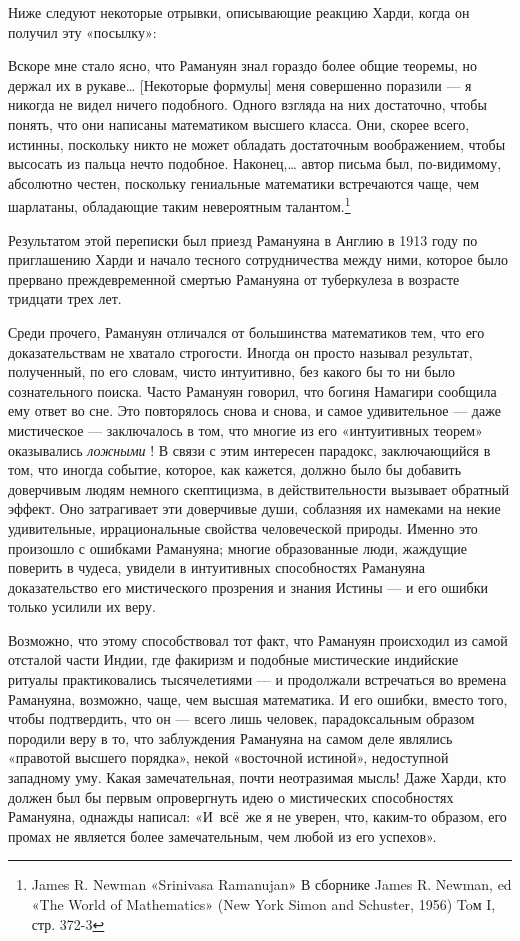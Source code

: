 \documentclass[../main.tex]{subfiles}
\begin{document}
Ниже следуют некоторые отрывки, описывающие реакцию Харди, когда он получил эту «посылку»:

Вскоре мне стало ясно, что Рамануян знал гораздо более общие теоремы, но держал их в рукаве\ldots{} {[}Некоторые формулы{]} меня совершенно поразили --- я никогда не видел ничего подобного. Одного взгляда на них достаточно, чтобы понять, что они написаны математиком высшего класса. Они, скорее всего, истинны, поскольку никто не может обладать достаточным воображением, чтобы высосать из пальца нечто подобное. Наконец,\ldots{} автор письма был, по-видимому, абсолютно честен, поскольку гениальные математики встречаются чаще, чем шарлатаны, обладающие таким невероятным талантом.\footnote{James R. Newman «Srinivasa Ramanujan» В сборнике James R. Newman, ed «The World of Mathematics» (New York Simon and Schuster, 1956) Toм I, стр. 372-3}

Результатом этой переписки был приезд Рамануяна в Англию в 1913 году по приглашению Харди и начало тесного сотрудничества между ними, которое было прервано преждевременной смертью Рамануяна от туберкулеза в возрасте тридцати трех лет.

Среди прочего, Рамануян отличался от большинства математиков тем, что его доказательствам не хватало строгости. Иногда он просто называл результат, полученный, по его словам, чисто интуитивно, без какого бы то ни было сознательного поиска. Часто Рамануян говорил, что богиня Намагири сообщила ему ответ во сне. Это повторялось снова и снова, и самое удивительное --- даже мистическое --- заключалось в том, что многие из его «интуитивных теорем» оказывались \emph{ложными} ! В связи с этим интересен парадокс, заключающийся в том, что иногда событие, которое, как кажется, должно было бы добавить доверчивым людям немного скептицизма, в действительности вызывает обратный эффект. Оно затрагивает эти доверчивые души, соблазняя их намеками на некие удивительные, иррациональные свойства человеческой природы. Именно это произошло с ошибками Рамануяна; многие образованные люди, жаждущие поверить в чудеса, увидели в интуитивных способностях Рамануяна доказательство его мистического прозрения и знания Истины --- и его ошибки только усилили их веру.

Возможно, что этому способствовал тот факт, что Рамануян происходил из самой отсталой части Индии, где факиризм и подобные мистические индийские ритуалы практиковались тысячелетиями --- и продолжали встречаться во времена Рамануяна, возможно, чаще, чем высшая математика. И его ошибки, вместо того, чтобы подтвердить, что он --- всего лишь человек, парадоксальным образом породили веру в то, что заблуждения Рамануяна на самом деле являлись «правотой высшего порядка», некой «восточной истиной», недоступной западному уму. Какая замечательная, почти неотразимая мысль! Даже Харди, кто должен был бы первым опровергнуть идею о мистических способностях Рамануяна, однажды написал: «И~всё~же я не уверен, что, каким-то образом, его промах не является более замечательным, чем любой из его успехов».
\end{document}
